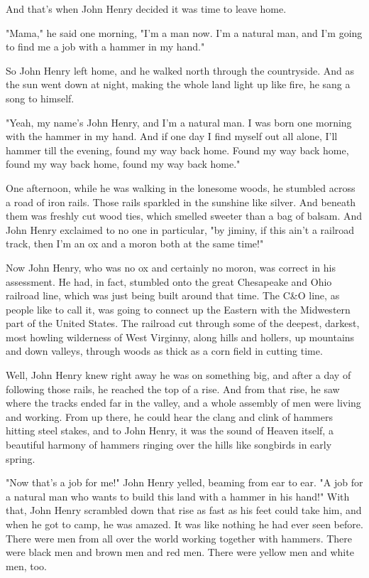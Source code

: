 And that's when John Henry decided it was time to leave home.

"Mama," he said one morning, "I'm a man now. I'm a natural man, and I'm going to find me a job with a hammer in my hand."

So John Henry left home, and he walked north through the countryside. And as the sun went down at night, making the whole land light up like fire, he sang a song to himself.

"Yeah, my name's John Henry, and I'm a natural man. I was born one morning with the hammer in my hand. And if one day I find myself out all alone, I'll hammer till the evening, found my way back home. Found my way back home, found my way back home, found my way back home."

One afternoon, while he was walking in the lonesome woods, he stumbled across a road of iron rails. Those rails sparkled in the sunshine like silver. And beneath them was freshly cut wood ties, which smelled sweeter than a bag of balsam. And John Henry exclaimed to no one in particular, "by jiminy, if this ain't a railroad track, then I'm an ox and a moron both at the same time!"

Now John Henry, who was no ox and certainly no moron, was correct in his assessment. He had, in fact, stumbled onto the great Chesapeake and Ohio railroad line, which was just being built around that time. The C\&O line, as people like to call it, was going to connect up the Eastern with the Midwestern part of the United States. The railroad cut through some of the deepest, darkest, most howling wilderness of West Virginny, along hills and hollers, up mountains and down valleys, through woods as thick as a corn field in cutting time.

Well, John Henry knew right away he was on something big, and after a day of following those rails, he reached the top of a rise. And from that rise, he saw where the tracks ended far in the valley, and a whole assembly of men were living and working. From up there, he could hear the clang and clink of hammers hitting steel stakes, and to John Henry, it was the sound of Heaven itself, a beautiful harmony of hammers ringing over the hills like songbirds in early spring.

"Now that's a job for me!" John Henry yelled, beaming from ear to ear. "A job for a natural man who wants to build this land with a hammer in his hand!" With that, John Henry scrambled down that rise as fast as his feet could take him, and when he got to camp, he was amazed. It was like nothing he had ever seen before. There were men from all over the world working together with hammers. There were black men and brown men and red men. There were yellow men and white men, too.

